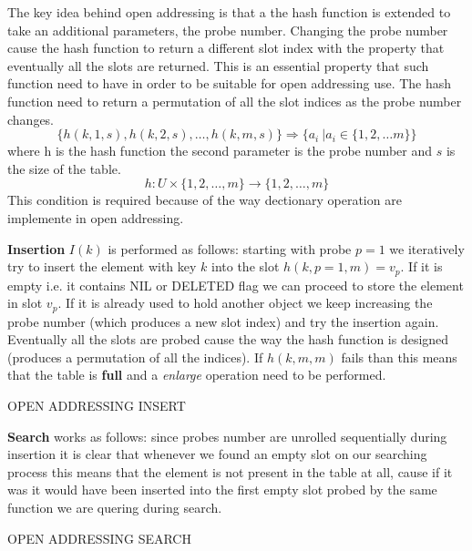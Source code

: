 The key idea behind open addressing is that a the hash function is extended to take an additional parameters, the probe number. 
Changing the probe number cause the hash function to return a different slot index with the property that eventually all the slots are returned. This is an essential property that such function need to have in order to be suitable for open addressing use.
The hash function need to return a permutation of all the slot indices as the probe number changes.
\[
\{h(k,1,s),h(k,2,s), \ldots ,h(k,m,s)\} \Rightarrow \{a_i \:| a_i \in \{1,2,\ldots m\}\}
\]
where h is the hash function the second parameter is the probe  number and $s$ is the size of the table.
\[
h : U \times \{1,2,\ldots,m\} \rightarrow \{1,2,\ldots,m\}
\]
This condition is required because of the way dectionary operation are implemente in open addressing.

\textbf{Insertion} $I(k)$ is performed as follows: starting with probe $p=1$ we iteratively try to insert the element with key $k$ into the slot $h(k,p=1,m)= v_p$. If it is empty i.e. it contains NIL or DELETED flag we can proceed to store the element in slot $v_p$. If it is already used to hold another object we keep increasing the probe number (which produces a new slot index) and try the insertion again. Eventually all the slots are probed cause the way the hash function is designed (produces a permutation of all the indices).
If $h(k,m,m)$ fails than this means that the table is \textbf{full} and a \textit{enlarge} operation need to be performed.

\begin{algorithm}
 
\caption{OPEN ADDRESSING INSERT}
\end{algorithm}

\textbf{Search} works as follows: since probes number are unrolled sequentially during insertion it is clear that whenever we found an empty slot on our searching process this means that the element is not present in the table at all, cause if it was it would have been inserted into the first empty slot probed by the same function we are quering during search.

\begin{algorithm}
 
\caption{OPEN ADDRESSING SEARCH}
\end{algorithm}

